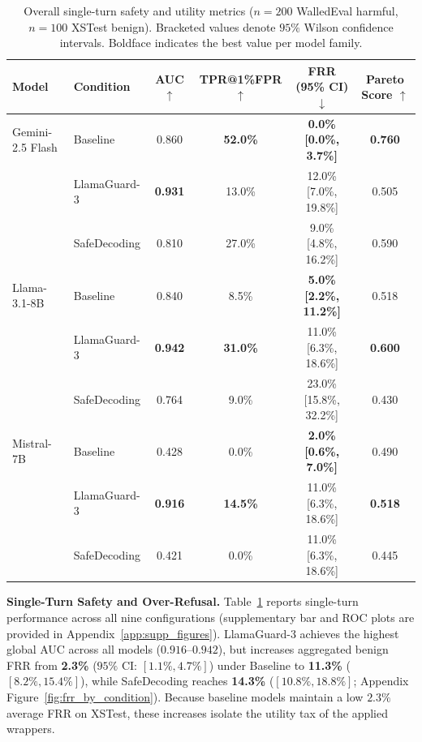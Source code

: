\documentclass[letterpaper]{article}
\begin{document}
\begin{table}[t]
\centering
\caption{Overall single-turn safety and utility metrics ($n=200$ WalledEval harmful, $n=100$ XSTest benign). Bracketed values denote $95\%$ Wilson confidence intervals. Boldface indicates the best value per model family.}
\label{tab:overall_safety_metrics}
\setlength{\tabcolsep}{8pt}
\renewcommand{\arraystretch}{1.1}
\begin{tabular}{@{}llcccc@{}}
\toprule
\textbf{Model} & \textbf{Condition} & \textbf{AUC} $\uparrow$ & \textbf{TPR@1\%FPR} $\uparrow$ & \textbf{FRR (95\% CI)} $\downarrow$ & \textbf{Pareto Score} $\uparrow$ \\
\midrule
Gemini-2.5 Flash & Baseline      & 0.860 & \textbf{52.0\%} & \textbf{0.0\% [0.0\%, 3.7\%]}   & \textbf{0.760} \\
                 & LlamaGuard-3  & \textbf{0.931} & 13.0\% & 12.0\% [7.0\%, 19.8\%] & 0.505 \\
                 & SafeDecoding  & 0.810 & 27.0\% & 9.0\% [4.8\%, 16.2\%]  & 0.590 \\
\midrule
Llama-3.1-8B     & Baseline      & 0.840 & 8.5\%  & \textbf{5.0\% [2.2\%, 11.2\%]}  & 0.518 \\
                 & LlamaGuard-3  & \textbf{0.942} & \textbf{31.0\%} & 11.0\% [6.3\%, 18.6\%] & \textbf{0.600} \\
                 & SafeDecoding  & 0.764 & 9.0\%  & 23.0\% [15.8\%, 32.2\%] & 0.430 \\
\midrule
Mistral-7B       & Baseline      & 0.428 & 0.0\%  & \textbf{2.0\% [0.6\%, 7.0\%]}   & 0.490 \\
                 & LlamaGuard-3  & \textbf{0.916} & \textbf{14.5\%} & 11.0\% [6.3\%, 18.6\%] & \textbf{0.518} \\
                 & SafeDecoding  & 0.421 & 0.0\%  & 11.0\% [6.3\%, 18.6\%] & 0.445 \\
\bottomrule
\end{tabular}
\end{table}

\textbf{Single-Turn Safety and Over-Refusal.} Table~\ref{tab:overall_safety_metrics} reports single-turn performance across all nine configurations (supplementary bar and ROC plots are provided in Appendix~\ref{app:supp_figures}). LlamaGuard-3 achieves the highest global AUC across all models ($0.916$--$0.942$), but increases aggregated benign FRR from \textbf{2.3\%} ($95\%$ CI: $[1.1\%, 4.7\%]$) under Baseline to \textbf{11.3\%} ($[8.2\%, 15.4\%]$), while SafeDecoding reaches \textbf{14.3\%} ($[10.8\%, 18.8\%]$; Appendix Figure~\ref{fig:frr_by_condition}). Because baseline models maintain a low $2.3\%$ average FRR on XSTest, these increases isolate the utility tax of the applied wrappers.
\end{document}
